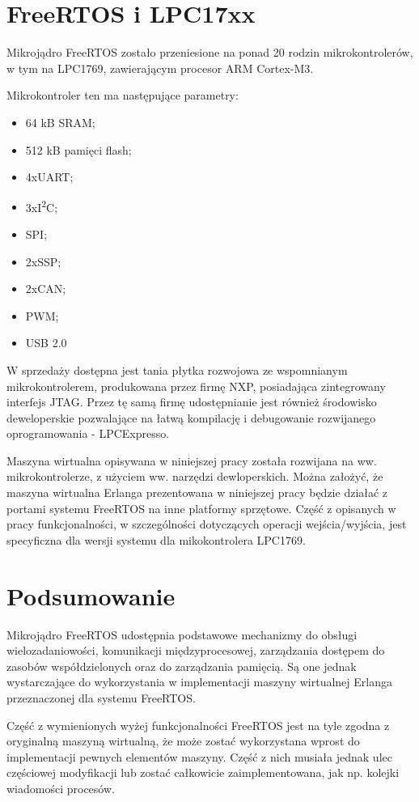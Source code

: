 \section{FreeRTOS i LPC17xx}
\label{sec:rtosLPC}

Mikrojądro FreeRTOS zostało przeniesione na ponad 20 rodzin mikrokontrolerów, w tym na LPC1769, zawierającym procesor ARM Cortex-M3.

Mikrokontroler ten ma następujące parametry:
\begin{itemize}
\item 64 kB SRAM;
\item 512 kB pamięci flash;
\item 4xUART;
\item 3xI\textsuperscript{2}C;
\item SPI;
\item 2xSSP;
\item 2xCAN;
\item PWM;
\item USB 2.0
\end{itemize}

W sprzedaży dostępna jest tania płytka rozwojowa ze wspomnianym mikrokontrolerem, produkowana przez firmę NXP, posiadająca zintegrowany interfejs JTAG. Przez tę samą firmę udostępnianie jest również środowisko deweloperskie pozwalające na łatwą kompilację i debugowanie rozwijanego oprogramowania - LPCExpresso.

Maszyna wirtualna opisywana w niniejszej pracy została rozwijana na ww. mikrokontrolerze, z użyciem ww. narzędzi dewloperskich. Można założyć, że maszyna wirtualna Erlanga prezentowana w niniejszej pracy będzie działać z portami systemu FreeRTOS na inne platformy sprzętowe. Część z opisanych w pracy funkcjonalności, w szczególności dotyczących operacji wejścia/wyjścia, jest specyficzna dla wersji systemu dla mikokontrolera LPC1769.

\section{Podsumowanie}
\label{sec:rtosPodsumowanie}

Mikrojądro FreeRTOS udostępnia podstawowe mechanizmy do obsługi wielozadaniowości, komunikacji międzyprocesowej, zarządzania dostępem do zasobów współdzielonych oraz do zarządzania pamięcią. Są one jednak wystarczające do wykorzystania w implementacji maszyny wirtualnej Erlanga przeznaczonej dla systemu FreeRTOS.

Część z wymienionych wyżej funkcjonalności FreeRTOS jest na tyle zgodna z oryginalną maszyną wirtualną, że może zostać wykorzystana wprost do implementacji pewnych elementów maszyny. Część z nich musiała jednak ulec częściowej modyfikacji lub zostać całkowicie zaimplementowana, jak np. kolejki wiadomości procesów. 